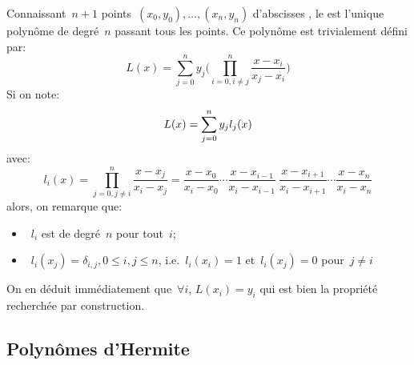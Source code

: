 Connaissant~$n + 1$ points~$(x_0, y_0),\dots,(x_n, y_n)$ d'abscisses , le  est l'unique polynôme de degré~$n$ passant tous les points. Ce polynôme est trivialement défini par: 
\begin{equation}
L(x) = \sum_{j=0}^{n} y_j \biggl(\prod_{i=0, i\neq j}^{n} \frac{x-x_i}{x_j-x_i} \biggr) 
\end{equation}
Si on note:
\begin{equation}
L(x) = \displaystyle\sum_{j=0}^{n} y_j l_j(x)
\end{equation}
avec:
\begin{equation}
l_i(x) = \prod_{j=0, j\neq i}^{n} \frac{x-x_j}{x_i-x_j} = \frac{x-x_0}{x_i-x_0} \cdots \frac{x-x_{i-1}}{x_i-x_{i-1}} ~ \frac{x-x_{i+1}}{x_i-x_{i+1}} \cdots \frac{x-x_{n}}{x_i-x_{n}}
\end{equation}
alors, on remarque que: 
\begin{itemize}
\item~$l_i$ est de degré~$n$ pour tout~$i$; 
\item~$l_i(x_j) = \delta_{i,j}, 0 \leq i,j \leq n$, i.e.~$l_i(x_i) = 1$ et~$l_i(x_j) = 0$ pour~$j\ne i$ 
\end{itemize}
On en déduit immédiatement que~$\forall i$, $L(x_i) = y_i$ qui est bien la propriété recherchée par construction. 

\medskip
\subsection{Polynômes d'Hermite}\label{Sec-PolHermite}

